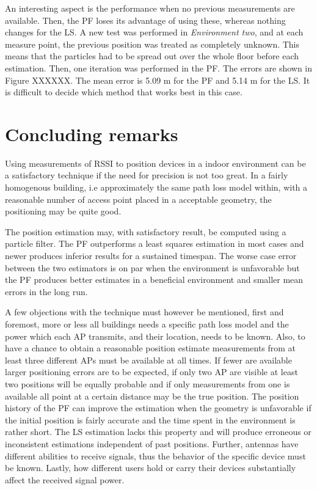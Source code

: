 \documentclass{LTHthesis}
\begin{document}
An interesting aspect is the performance when no previous measurements are available. Then, the PF loses its advantage of using these, whereas nothing changes for the LS. A new test was performed in \emph{Environment two}, and at each measure point, the previous position was treated as completely unknown. This means that the particles had to be spread out over the whole floor before each estimation. Then, one iteration was performed in the PF. The errors are shown in Figure XXXXXX. The mean error is 5.09 m for the PF and 5.14 m for the LS. It is difficult to decide which method that works best in this case. 

%
\section{Concluding remarks}
%
Using measurements of RSSI to position devices in a indoor environment can be a satisfactory technique if the need for precision is not too great. In a fairly homogenous building, i.e approximately the same path loss model within, with a reasonable number of access point placed in a acceptable geometry, the positioning may be quite good. 

The position estimation may, with satisfactory result, be computed using a particle filter. The PF outperforms a least squares estimation in most cases and newer produces inferior results for a sustained timespan. The worse case error between the two estimators is on par when the environment is unfavorable but the PF produces better estimates in a beneficial environment and smaller mean errors in the long run. 

A few objections with the technique must however be mentioned, first and foremost, more or less all buildings needs a specific path loss model and the power which each AP transmits, and their location, needs to be known. Also, to have a chance to obtain a reasonable position estimate measurements from at least three different APs must be available at all times. If fewer are available larger positioning errors are to be expected, if only two AP are visible at least two positions will be equally probable and if only measurements from one is available all point at a certain distance may be the true position. The position history of the PF can improve the estimation when the geometry is unfavorable if the initial position is fairly accurate and the time spent in the environment is rather short. The LS estimation lacks this property and will produce erroneous or inconsistent estimations independent of past positions. Further, antennas have different abilities to receive signals, thus the behavior of the specific device must be known. Lastly, how different users hold or carry their devices substantially affect the received signal power.  
\end{document}
